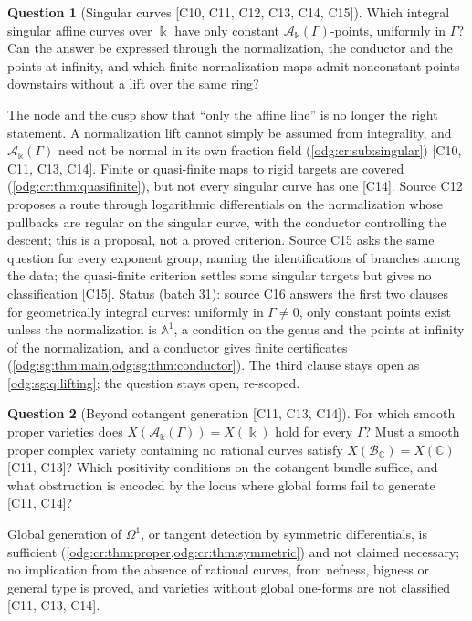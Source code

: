 \documentclass[11pt,oneside]{article}
\numberwithin{equation}{section}
\theoremstyle{definition}
\newtheorem{question}[question]{Question}
\theoremstyle{remark}
\newcommand{\C}{\mathbb C}
\newcommand{\BC}{\mathcal B_{\C}}
\newcommand{\src}[1]{\textup{\textsf{\small[#1]}}}
\newcommand{\crA}{\mathcal A_\Bbbk(\Gamma)}
\newcommand{\Aff}{\mathbb A}
\begin{document}
\begin{question}[Singular curves \src{C10, C11, C12, C13, C14, C15}]\label{odg:cr:q:singular}
Which integral singular affine curves over $\Bbbk$ have only constant
$\crA$-points, uniformly in $\Gamma$? Can the answer be expressed through the
normalization, the conductor and the points at infinity, and which finite
normalization maps admit nonconstant points downstairs without a lift over the same
ring?
\end{question}
The node and the cusp show that ``only the affine line'' is no longer the right
statement. A normalization lift cannot simply be assumed from integrality,
and $\crA$ need not be normal in its own fraction field (\cref{odg:cr:sub:singular}) \src{C10, C11, C13, C14}. Finite or
quasi-finite maps to rigid targets are covered (\cref{odg:cr:thm:quasifinite}), but
not every singular curve has one \src{C14}. Source C12 proposes a route through
logarithmic differentials on the normalization whose pullbacks are regular on the
singular curve, with the conductor controlling the descent; this is a proposal, not a
proved criterion. Source C15 asks the same question for every exponent group, naming the
identifications of branches among the data; the quasi-finite criterion settles some
singular targets but gives no classification \src{C15}. Status (batch 31): source C16
answers the first two clauses for geometrically integral curves: uniformly in
$\Gamma\ne0$, only constant points exist unless the normalization is $\Aff^1$, a condition
on the genus and the points at infinity of the normalization, and a conductor gives finite
certificates (\cref{odg:sg:thm:main,odg:sg:thm:conductor}). The third clause stays open as
\cref{odg:sg:q:lifting}; the question stays open, re-scoped.

\begin{question}[Beyond cotangent generation \src{C11, C13, C14}]\label{odg:cr:q:beyond}
For which smooth proper varieties does $X(\crA)=X(\Bbbk)$ hold for every $\Gamma$?
Must a smooth proper complex variety containing no rational curves satisfy
$X(\BC)=X(\C)$ \src{C11, C13}? Which positivity conditions on the cotangent bundle
suffice, and what obstruction is encoded by the locus where global forms fail to
generate \src{C11, C14}?
\end{question}
Global generation of $\Omega^1$, or tangent detection by symmetric differentials, is
sufficient (\cref{odg:cr:thm:proper,odg:cr:thm:symmetric}) and not claimed necessary;
no implication from the absence of rational curves, from nefness, bigness or general
type is proved, and varieties without global one-forms are not classified
\src{C11, C13, C14}.
\end{document}
